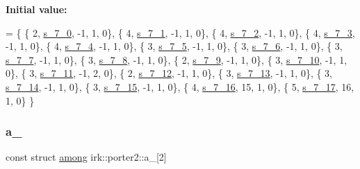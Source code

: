 {\bfseries Initial value\+:}
\begin{DoxyCode}
=
\{
 \{ 2, \mbox{\hyperlink{namespaceirk_1_1porter2_ab3577e9564e4034277ccc66896287e32}{s\_7\_0}}, -1, 1, 0\},
 \{ 4, \mbox{\hyperlink{namespaceirk_1_1porter2_a1b1a3b4b605ae1fd6c3f9cacf7c55d31}{s\_7\_1}}, -1, 1, 0\},
 \{ 4, \mbox{\hyperlink{namespaceirk_1_1porter2_a986d82c9d222a4d79d5c2a44126e9bb8}{s\_7\_2}}, -1, 1, 0\},
 \{ 4, \mbox{\hyperlink{namespaceirk_1_1porter2_a9f7385b761c14f64c96e2e01bb7c8b5c}{s\_7\_3}}, -1, 1, 0\},
 \{ 4, \mbox{\hyperlink{namespaceirk_1_1porter2_a75502f5966d862a13d4f0cb66854360b}{s\_7\_4}}, -1, 1, 0\},
 \{ 3, \mbox{\hyperlink{namespaceirk_1_1porter2_aebfd8be071ff44d286b30a223033018c}{s\_7\_5}}, -1, 1, 0\},
 \{ 3, \mbox{\hyperlink{namespaceirk_1_1porter2_a5332b6867ccd500c988ebb3318bd2a2b}{s\_7\_6}}, -1, 1, 0\},
 \{ 3, \mbox{\hyperlink{namespaceirk_1_1porter2_a0f4b0ee8944bd14c3a2194765cda340f}{s\_7\_7}}, -1, 1, 0\},
 \{ 3, \mbox{\hyperlink{namespaceirk_1_1porter2_adbc370a29ff47229e53f473c386cf2d1}{s\_7\_8}}, -1, 1, 0\},
 \{ 2, \mbox{\hyperlink{namespaceirk_1_1porter2_ad7ea49c3430a2c5a3e0a62d43ec75e7c}{s\_7\_9}}, -1, 1, 0\},
 \{ 3, \mbox{\hyperlink{namespaceirk_1_1porter2_a7ae766a2c55b345e8a09917207190a1c}{s\_7\_10}}, -1, 1, 0\},
 \{ 3, \mbox{\hyperlink{namespaceirk_1_1porter2_ac71df7c129f7523ac9fa992698e521e3}{s\_7\_11}}, -1, 2, 0\},
 \{ 2, \mbox{\hyperlink{namespaceirk_1_1porter2_af8082fa67e9829d05163cd8175199ac6}{s\_7\_12}}, -1, 1, 0\},
 \{ 3, \mbox{\hyperlink{namespaceirk_1_1porter2_a8b2dab09de3bf605b454b4aea29a3e76}{s\_7\_13}}, -1, 1, 0\},
 \{ 3, \mbox{\hyperlink{namespaceirk_1_1porter2_ae629cfbda599ba516514ffd23aee4588}{s\_7\_14}}, -1, 1, 0\},
 \{ 3, \mbox{\hyperlink{namespaceirk_1_1porter2_aa4f37554b14c2dd44290cf29e63d2292}{s\_7\_15}}, -1, 1, 0\},
 \{ 4, \mbox{\hyperlink{namespaceirk_1_1porter2_a43a418ab23b893c809bd6682ecba9053}{s\_7\_16}}, 15, 1, 0\},
 \{ 5, \mbox{\hyperlink{namespaceirk_1_1porter2_aaeae3bb07dc6b3f9b33f534d30f6d362}{s\_7\_17}}, 16, 1, 0\}
\}
\end{DoxyCode}
\mbox{\label{namespaceirk_1_1porter2_a0a300713e83c720e1791ad3bb440cd5c}} 
\subsubsection{\texorpdfstring{a\+\_}{a\_8}}
{\footnotesize\ttfamily const struct \mbox{\hyperlink{structirk_1_1porter2_1_1among}{among}} irk\+::porter2\+::a\+\_\mbox{[}2\mbox{]}\hspace{0.3cm}{\ttfamily [static]}}

